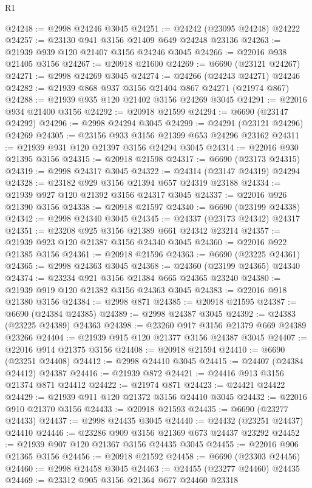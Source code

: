 \begin{lexlean}{R1}
\begin{coremodule}
@24248 := @2998 @24246 @3045
@24251 := @24242 (@23095 @24248) @24222
@24257 := @23130 @941 @3156 @21409 @649 @24248 @23136
@24263 := @21939 @939 @120 @21407 @3156 @24246 @3045
@24266 := @22016 @938 @21405 @3156
@24267 := @20918 @21600
@24269 := @6690 (@23121 @24267)
@24271 := @2998 @24269 @3045
@24274 := @24266 (@24243 @24271) @24246
@24282 := @21939 @868 @937 @3156 @21404 @867 @24271 (@21974 @867)
@24288 := @21939 @935 @120 @21402 @3156 @24269 @3045
@24291 := @22016 @934 @21400 @3156
@24292 := @20918 @21599
@24294 := @6690 (@23147 @24292)
@24296 := @2998 @24294 @3045
@24299 := @24291 (@23121 @24296) @24269
@24305 := @23156 @933 @3156 @21399 @653 @24296 @23162
@24311 := @21939 @931 @120 @21397 @3156 @24294 @3045
@24314 := @22016 @930 @21395 @3156
@24315 := @20918 @21598
@24317 := @6690 (@23173 @24315)
@24319 := @2998 @24317 @3045
@24322 := @24314 (@23147 @24319) @24294
@24328 := @23182 @929 @3156 @21394 @657 @24319 @23188
@24334 := @21939 @927 @120 @21392 @3156 @24317 @3045
@24337 := @22016 @926 @21390 @3156
@24338 := @20918 @21597
@24340 := @6690 (@23199 @24338)
@24342 := @2998 @24340 @3045
@24345 := @24337 (@23173 @24342) @24317
@24351 := @23208 @925 @3156 @21389 @661 @24342 @23214
@24357 := @21939 @923 @120 @21387 @3156 @24340 @3045
@24360 := @22016 @922 @21385 @3156
@24361 := @20918 @21596
@24363 := @6690 (@23225 @24361)
@24365 := @2998 @24363 @3045
@24368 := @24360 (@23199 @24365) @24340
@24374 := @23234 @921 @3156 @21384 @665 @24365 @23240
@24380 := @21939 @919 @120 @21382 @3156 @24363 @3045
@24383 := @22016 @918 @21380 @3156
@24384 := @2998 @871
@24385 := @20918 @21595
@24387 := @6690 (@24384 @24385)
@24389 := @2998 @24387 @3045
@24392 := @24383 (@23225 @24389) @24363
@24398 := @23260 @917 @3156 @21379 @669 @24389 @23266
@24404 := @21939 @915 @120 @21377 @3156 @24387 @3045
@24407 := @22016 @914 @21375 @3156
@24408 := @20918 @21594
@24410 := @6690 (@23251 @24408)
@24412 := @2998 @24410 @3045
@24415 := @24407 (@24384 @24412) @24387
@24416 := @21939 @872
@24421 := @24416 @913 @3156 @21374 @871 @24412
@24422 := @21974 @871
@24423 := @24421 @24422
@24429 := @21939 @911 @120 @21372 @3156 @24410 @3045
@24432 := @22016 @910 @21370 @3156
@24433 := @20918 @21593
@24435 := @6690 (@23277 @24433)
@24437 := @2998 @24435 @3045
@24440 := @24432 (@23251 @24437) @24410
@24446 := @23286 @909 @3156 @21369 @673 @24437 @23292
@24452 := @21939 @907 @120 @21367 @3156 @24435 @3045
@24455 := @22016 @906 @21365 @3156
@24456 := @20918 @21592
@24458 := @6690 (@23303 @24456)
@24460 := @2998 @24458 @3045
@24463 := @24455 (@23277 @24460) @24435
@24469 := @23312 @905 @3156 @21364 @677 @24460 @23318

\end{coremodule}
\end{lexlean}
